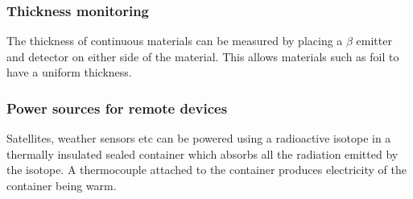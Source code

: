 \documentclass{article}[18pt]
\begin{document}
\subsubsection{Thickness monitoring}
The thickness of continuous materials can be measured by placing a $\beta$ emitter and detector on either side of the material. This allows materials such as foil to have a uniform thickness.
\subsubsection{Power sources for remote devices}
Satellites, weather sensors etc can be powered using a radioactive isotope in a thermally insulated sealed container which absorbs all the radiation emitted by the isotope. A thermocouple attached to the container produces electricity of the container being warm.
\end{document}
